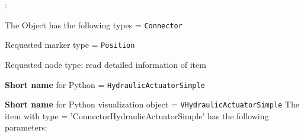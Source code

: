 \noindent {}:
\bi
  \item The Object has the following types = \texttt{Connector}
  \item Requested marker type = \texttt{Position}
  \item Requested node type: read detailed information of item
  \item {\bf Short name} for Python = \texttt{HydraulicActuatorSimple}
  \item {\bf Short name} for Python visualization object = \texttt{VHydraulicActuatorSimple}
\ei\vspace{12pt} \noindent 
The item  with type = 'ConnectorHydraulicActuatorSimple' has the following parameters:
\vspace{-0.5cm}\\
\vspace{-0.5cm}\\
